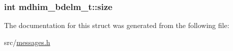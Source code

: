 \hypertarget{structmdhim__bdelm__t_a1c92bb6d1ffe28e7cd24aa2041f469da}{
\subsubsection[{size}]{\setlength{\rightskip}{0pt plus 5cm}int mdhim\-\_\-bdelm\-\_\-t\-::size}}\label{structmdhim__bdelm__t_a1c92bb6d1ffe28e7cd24aa2041f469da}


The documentation for this struct was generated from the following file\-:\begin{DoxyCompactItemize}
\item 
src/\hyperlink{messages_8h}{messages.\-h}\end{DoxyCompactItemize}
